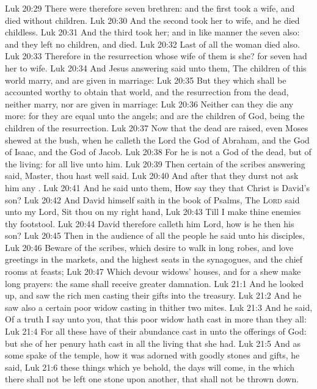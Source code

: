 \vs Luk 20:29 There were therefore seven brethren: and the first took a wife, and died without children.
\vs Luk 20:30 And the second took her to wife, and he died childless.
\vs Luk 20:31 And the third took her; and in like manner the seven also: and they left no children, and died.
\vs Luk 20:32 Last of all the woman died also.
\vs Luk 20:33 Therefore in the resurrection whose wife of them is she? for seven had her to wife.
\vs Luk 20:34 And Jesus answering said unto them, The children of this world marry, and are given in marriage:
\vs Luk 20:35 But they which shall be accounted worthy to obtain that world, and the resurrection from the dead, neither marry, nor are given in marriage:
\vs Luk 20:36 Neither can they die any more: for they are equal unto the angels; and are the children of God, being the children of the resurrection.
\vs Luk 20:37 Now that the dead are raised, even Moses shewed at the bush, when he calleth the Lord the God of Abraham, and the God of Isaac, and the God of Jacob.
\vs Luk 20:38 For he is not a God of the dead, but of the living: for all live unto him.
\vs Luk 20:39 Then certain of the scribes answering said, Master, thou hast well said.
\vs Luk 20:40 And after that they durst not ask him any .
\vs Luk 20:41 And he said unto them, How say they that Christ is David's son?
\vs Luk 20:42 And David himself saith in the book of Psalms, The \textsc{Lord} said unto my Lord, Sit thou on my right hand,
\vs Luk 20:43 Till I make thine enemies thy footstool.
\vs Luk 20:44 David therefore calleth him Lord, how is he then his son?
\vs Luk 20:45 Then in the audience of all the people he said unto his disciples,
\vs Luk 20:46 Beware of the scribes, which desire to walk in long robes, and love greetings in the markets, and the highest seats in the synagogues, and the chief rooms at feasts;
\vs Luk 20:47 Which devour widows' houses, and for a shew make long prayers: the same shall receive greater damnation.
\vs Luk 21:1 And he looked up, and saw the rich men casting their gifts into the treasury.
\vs Luk 21:2 And he saw also a certain poor widow casting in thither two mites.
\vs Luk 21:3 And he said, Of a truth I say unto you, that this poor widow hath cast in more than they all:
\vs Luk 21:4 For all these have of their abundance cast in unto the offerings of God: but she of her penury hath cast in all the living that she had.
\vs Luk 21:5 And as some spake of the temple, how it was adorned with goodly stones and gifts, he said,
\vs Luk 21:6  these things which ye behold, the days will come, in the which there shall not be left one stone upon another, that shall not be thrown down.
